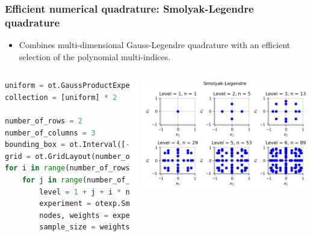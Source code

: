 \documentclass[aspectratio=169]{beamer}
\begin{document}
\begin{frame}[containsverbatim]
\frametitle{Efficient numerical quadrature: Smolyak-Legendre quadrature}

\begin{itemize}
\item Combines multi-dimensional Gauss-Legendre quadrature with an efficient selection of the polynomial multi-indices.
\end{itemize}

  \begin{columns}

\begin{lstlisting}[language=Python, numbers = none]
uniform = ot.GaussProductExperiment(ot.Uniform(-1.0, 1.0))
collection = [uniform] * 2

number_of_rows = 2
number_of_columns = 3
bounding_box = ot.Interval([-1.05] * 2, [1.05] * 2)
grid = ot.GridLayout(number_of_rows, number_of_columns)
for i in range(number_of_rows):
    for j in range(number_of_columns):
        level = 1 + j + i * number_of_columns
        experiment = otexp.SmolyakExperiment(collection, level)
        nodes, weights = experiment.generateWithWeights()
        sample_size = weights.getDimension()

\end{lstlisting}


\centering
    \includegraphics[width=1.\textwidth]{figures/Smolyak1.png}
  \end{columns}



\end{frame}
\end{document}
